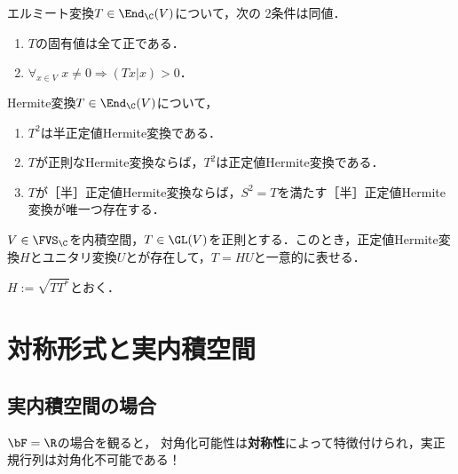 \documentclass[uplatex, dvipdfmx]{jsreport}
\begin{document}
\begin{proposition}
    エルミート変換$T\in\End_\C(V)$について，次の
    2条件は同値．
    \begin{enumerate}
        \item $T$の固有値は全て正である．
        \item $\forall_{x\in V}\;x\ne0\Rightarrow(Tx|x)>0$．
    \end{enumerate}
\end{proposition}

\begin{corollary}
    Hermite変換$T\in\End_\C(V)$について，
    \begin{enumerate}
        \item $T^2$は半正定値Hermite変換である．
        \item $T$が正則なHermite変換ならば，$T^2$は正定値Hermite変換である．
        \item $T$が［半］正定値Hermite変換ならば，$S^2=T$を満たす［半］正定値Hermite変換が唯一つ存在する．
    \end{enumerate}
\end{corollary}

\begin{theorem}
    $V\in\FVS_\C$を内積空間，$T\in\GL(V)$を正則とする．このとき，正定値Hermite変換$H$とユニタリ変換$U$とが存在して，$T=HU$と一意的に表せる．
\end{theorem}
\begin{Proof}
    $H:=\sqrt{TT^*}$とおく．
\end{Proof}

\section{対称形式と実内積空間}

\subsection{実内積空間の場合}

\begin{tcolorbox}[colframe=ForestGreen, colback=ForestGreen!10!white,breakable,colbacktitle=ForestGreen!40!white,coltitle=black,fonttitle=\bfseries\sffamily,
title=]
    $\bF=\R$の場合を観ると，
    対角化可能性は\textbf{対称性}によって特徴付けられ，実正規行列は対角化不可能である！
\end{tcolorbox}
\end{document}
